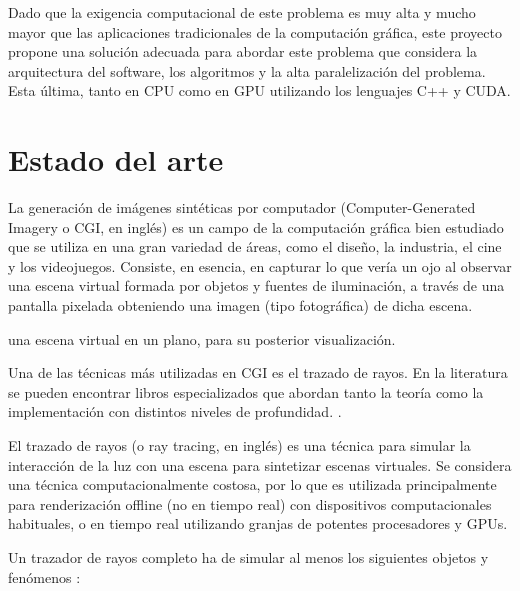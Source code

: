 \documentclass[10pt, a4paper]{article}
\begin{document}
Dado que la exigencia computacional de este problema es muy alta y mucho mayor que las aplicaciones tradicionales de la computación gráfica, este proyecto propone una solución adecuada para abordar este problema que considera la arquitectura del software, los algoritmos y la alta paralelización del problema. Esta última, tanto en CPU como en GPU utilizando los lenguajes C++ y CUDA.

\section{Estado del arte}

La generación de imágenes sintéticas por computador (Computer-Generated Imagery o CGI, en inglés) es un campo de la computación gráfica bien estudiado que se utiliza en una gran variedad de áreas, como el diseño, la industria, el cine y los videojuegos. Consiste, en esencia, en capturar lo que vería un ojo al observar una escena virtual formada por objetos y fuentes de iluminación, a través de una pantalla pixelada obteniendo una imagen (tipo fotográfica) de dicha escena.

una escena virtual en un plano, para su posterior visualización.

Una de las técnicas más utilizadas en CGI es el trazado de rayos. En la literatura se pueden encontrar libros especializados que abordan tanto la teoría como la implementación con distintos niveles de profundidad. \cite{Shirley:2024} \cite{Pharr:2023}.

El trazado de rayos (o ray tracing, en inglés) es una técnica para simular la interacción de la luz con una escena para sintetizar escenas virtuales. Se considera una técnica computacionalmente costosa, por lo que es utilizada principalmente para renderización offline (no en tiempo real) con dispositivos computacionales habituales, o en tiempo real utilizando granjas de potentes procesadores y GPUs.

Un trazador de rayos completo ha de simular al menos los siguientes objetos y fenómenos \cite{Pharr:2023}: 
\end{document}
